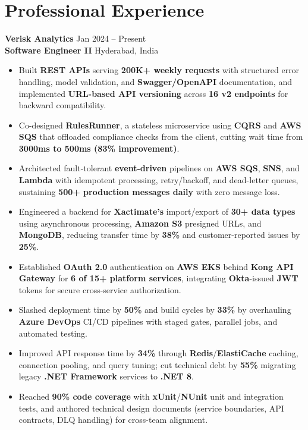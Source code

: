 \documentclass[a4paper,10pt]{article}
\begin{document}
\section*{Professional Experience}

\textbf{Verisk Analytics} \hfill Jan 2024 -- Present \\
\textbf{Software Engineer II} \hfill Hyderabad, India

\begin{itemize}[leftmargin=*]
    \item Built \textbf{REST APIs} serving \textbf{200K+ weekly requests} with structured error handling, model validation, and \textbf{Swagger/OpenAPI} documentation, and implemented \textbf{URL-based API versioning} across \textbf{16 v2 endpoints} for backward compatibility.
    \item Co-designed \textbf{RulesRunner}, a stateless microservice using \textbf{CQRS} and \textbf{AWS SQS} that offloaded compliance checks from the client, cutting wait time from \textbf{3000ms to 500ms (83\% improvement)}.
    \item Architected fault-tolerant \textbf{event-driven} pipelines on \textbf{AWS SQS}, \textbf{SNS}, and \textbf{Lambda} with idempotent processing, retry/backoff, and dead-letter queues, sustaining \textbf{500+ production messages daily} with zero message loss.
    \item Engineered a backend for \textbf{Xactimate's} import/export of \textbf{30+ data types} using asynchronous processing, \textbf{Amazon S3} presigned URLs, and \textbf{MongoDB}, reducing transfer time by \textbf{38\%} and customer-reported issues by \textbf{25\%}.
    \item Established \textbf{OAuth 2.0} authentication on \textbf{AWS EKS} behind \textbf{Kong API Gateway} for \textbf{6 of 15+ platform services}, integrating \textbf{Okta}-issued \textbf{JWT} tokens for secure cross-service authorization.
    \item Slashed deployment time by \textbf{50\%} and build cycles by \textbf{33\%} by overhauling \textbf{Azure DevOps} CI/CD pipelines with staged gates, parallel jobs, and automated testing.
    \item Improved API response time by \textbf{34\%} through \textbf{Redis}/\textbf{ElastiCache} caching, connection pooling, and query tuning; cut technical debt by \textbf{55\%} migrating legacy \textbf{.NET Framework} services to \textbf{.NET 8}.
    \item Reached \textbf{90\% code coverage} with \textbf{xUnit}/\textbf{NUnit} unit and integration tests, and authored technical design documents (service boundaries, API contracts, DLQ handling) for cross-team alignment.
\end{itemize}
\end{document}
